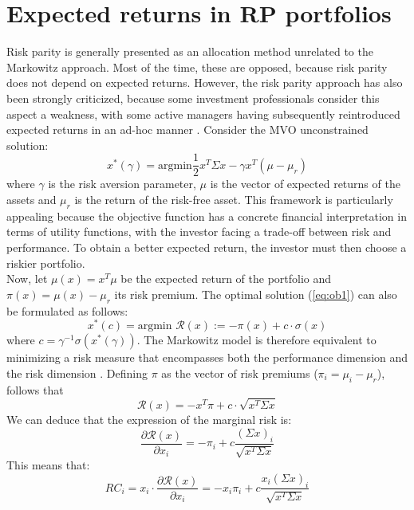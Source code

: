 \section{Expected returns in RP portfolios}
Risk parity is generally presented as an allocation method unrelated to the Markowitz approach. Most of the time, these are opposed, because risk parity does not depend on expected returns. However, the risk parity approach has also been strongly criticized, because some investment professionals consider this aspect a weakness, with some active managers having subsequently reintroduced expected returns in an ad-hoc manner \cite{intr}. Consider the MVO unconstrained solution:
\begin{equation}\label{eq:ob1}
x^*(\gamma) = \mbox{argmin} \frac{1}{2} x^T \Sigma x - \gamma x^T (\mu - \mu_r)
\end{equation}
where $\gamma$ is the risk aversion parameter, $\mu$ is the vector of expected returns of the assets and $\mu_r$ is the return of the risk-free asset. This framework is particularly appealing because the objective function has a concrete financial interpretation in terms of utility functions, with the investor facing a trade-off between risk and performance. To obtain a better expected return, the investor must then choose a riskier portfolio.\\
Now, let $\mu(x) = x^T \mu$ be the expected return of the portfolio and $\pi(x) = \mu(x) - \mu_r$ its risk premium. The optimal solution (\ref{eq:ob1}) can also be formulated as follows:
\begin{equation}
x^*(c) =\mbox{argmin } \mathcal{R}(x) := - \pi(x) + c \cdot \sigma(x)
\end{equation}
where $c = \gamma^{-1} \sigma(x^*(\gamma))$. The Markowitz model is therefore equivalent to minimizing a risk measure that
encompasses both the performance dimension and the risk dimension \cite{intr}. Defining $\pi$ as the vector of risk premiums ($\pi_i = \mu_i - \mu_r$), follows that
\begin{equation}\label{eq:risk2}
\mathcal{R}(x) = -x^T \pi + c \cdot \sqrt{x^T \Sigma x}
\end{equation}
We can deduce that the expression of the marginal risk is:
\begin{equation}
\frac{\partial \mathcal{R}(x)}{\partial x_i} = -\pi_i + c \frac{(\Sigma x)_i}{\sqrt{x^T \Sigma x}}
\end{equation}
This means that:
\begin{equation}
RC_i = x_i \cdot \frac{\partial \mathcal{R}(x)}{\partial x_i} = -x_i\pi_i + c \frac{x_i(\Sigma x)_i}{\sqrt{x^T \Sigma x}}
\end{equation}

